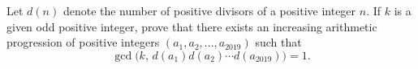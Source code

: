 Let $d(n)$ denote the number of positive divisors of a positive integer $n$. If $k$ is a given odd positive integer, prove that there exists an increasing arithmetic progression of positive integers $(a_1, a_2, \dots, a_{2019})$ such that
\[
\gcd\bigl(k,\, d(a_1)d(a_2)\cdots d(a_{2019})\bigr) = 1.
\]
